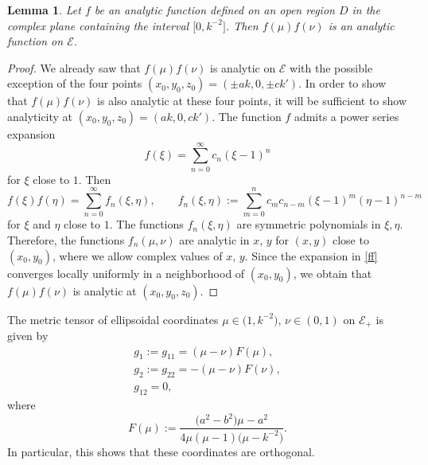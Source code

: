 \documentclass[pdftex]{sigma}
\newtheorem{Lemma}[thm]{Lemma}
\newcommand{\E}{\mathcal{E}}
\numberwithin{equation}{section}
\begin{document}
\begin{Lemma}\label{l1}
Let $f$ be an analytic function defined on an open region $D$ in the complex plane containing the interval $\bigl[0,k^{-2}\bigr]$.
Then $f(\mu)f(\nu)$ is an analytic function on $\E$.
\end{Lemma}
\begin{proof}
We already saw that $f(\mu)f(\nu)$ is analytic on $\E$ with the possible exception of the four points
$(x_0,y_0,z_0)=(\pm ak,0,\pm ck')$.
In order to show that $f(\mu)f(\nu)$ is also analytic at these four points, it will be
sufficient to show analyticity at $(x_0,y_0,z_0)=(ak,0,ck')$.
The function $f$ admits a power series expansion
\[ f(\xi)=\sum_{n=0}^\infty c_n (\xi-1)^n \]
for $\xi$ close to $1$.
Then
\begin{equation}\label{ff}
 f(\xi)f(\eta)=\sum_{n=0}^\infty f_n(\xi,\eta),\qquad f_n(\xi,\eta):=\sum_{m=0}^n c_mc_{n-m} (\xi-1)^m(\eta-1)^{n-m}
 \end{equation}
for $\xi$ and $\eta$ close to $1$.
The functions $f_n(\xi,\eta)$ are symmetric polynomials in $\xi,\eta$. Therefore, the functions
$f_n(\mu,\nu)$ are analytic in $x$, $y$
for $(x,y)$ close to $(x_0,y_0)$, where we allow complex values of $x$, $y$.
Since the expansion in \eqref{ff} converges locally uniformly in a neighborhood of $(x_0,y_0)$, we obtain
that $f(\mu)f(\nu)$ is analytic at $(x_0,y_0,z_0)$.
\end{proof}

The metric tensor of ellipsoidal coordinates $\mu\in\bigl(1,k^{-2}\bigr)$, $\nu\in(0,1)$ on $\E_+$ is given by
\begin{gather}
 g_1 := g_{11}=(\mu-\nu) F(\mu),\label{gg1}\\
 g_2 := g_{22}=-(\mu-\nu) F(\nu),\label{gg2}\\
 g_{12} = 0,\label{gg3}
\end{gather}
where
\[ F(\mu):=\frac{\bigl(a^2-b^2\bigr)\mu-a^2}{4\mu(\mu-1)\bigl(\mu-k^{-2}\bigr)} .\]
In particular, this shows that these coordinates are orthogonal.
\end{document}
